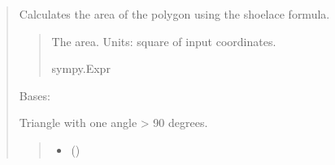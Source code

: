 \documentclass[letterpaper,10pt,english]{sphinxmanual}
\begin{document}
\begin{quote}
\begin{fulllineitems}
\begin{fulllineitems}
\label{\detokenize{pygeox:pygeox.custom_objects.Kite.area}}
\pysigstartsignatures
\pysigline
{}
\pysigstopsignatures
\sphinxAtStartPar
Calculates the area of the polygon using the shoelace formula.
\begin{quote}\begin{description}
\sphinxAtStartPar
The area. Units: square of input coordinates.

\sphinxAtStartPar
sympy.Expr

\end{description}\end{quote}

\end{fulllineitems}


\end{fulllineitems}


\begin{fulllineitems}
\label{\detokenize{pygeox:pygeox.custom_objects.ObtuseTriangle}}
\pysigstartsignatures
\pysiglinewithargsret
{}
{\sphinxparamcomma {}\sphinxparamcomma {}\sphinxparamcomma {}\sphinxparamcomma {}\sphinxparamcomma {}}
{}
\pysigstopsignatures
\sphinxAtStartPar
Bases: 

\sphinxAtStartPar
Triangle with one angle \textgreater{} 90 degrees.
\begin{quote}\begin{description}
\begin{itemize}
\item {} 
\sphinxAtStartPar
{} ()


\end{itemize}
\end{description}
\end{quote}
\end{fulllineitems}
\end{quote}
\end{document}
